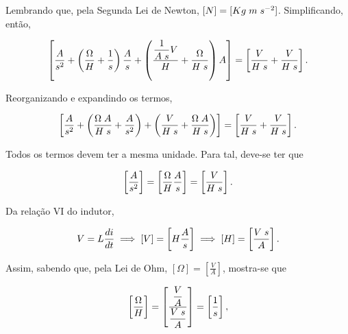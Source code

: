 \documentclass{article}
\numberwithin{equation}{section}
\let\l\left
\let\r\right
\let\dfr\dfrac
\begin{document}
\noindent Lembrando que, pela Segunda Lei de Newton, $[N] = [Kg \hspace{1mm} m \hspace{1mm}s^{-2}]$. Simplificando, então,

\begin{equation*}
    \l[ \dfr{A}{s^2} + \l( \dfr{\Omega}{H} + \dfr{1}{s}\r)\dfr{A}{s} + \l( \dfr{\dfr{1}{A \hspace{1mm} s} V}{H} + \dfr{\Omega}{H \hspace{1mm} s} \r) A \r] = \l[ \dfr{V}{H \hspace{1mm} s}  + \dfr{V}{H \hspace{1mm} s}\r].
\end{equation*}

\noindent Reorganizando e expandindo os termos,

\begin{equation*}
    \l[ \dfr{A}{s^2} + \l( \dfr{\Omega \hspace{1mm} A}{H \hspace{1mm} s} + \dfr{A}{s^2}\r) + \l( \dfr{V}{H \hspace{1mm} s} + \dfr{\Omega \hspace{1mm} A}{H \hspace{1mm} s} \r) \r] = \l[ \dfr{V}{H \hspace{1mm} s}  + \dfr{V}{H \hspace{1mm} s}\r].
\end{equation*}

\noindent Todos os termos devem ter a mesma unidade. Para tal, deve-se ter que

\begin{equation*}
    \l[\dfr{A}{s^2} \r] = \l[ \dfr{\Omega}{H} \dfr{A}{s} \r] = \l[ \dfr{V}{H \hspace{1mm} s} \r].
\end{equation*}

\noindent Da relação VI do indutor,

\begin{equation*}
    V = L \dfr{di}{dt} \implies [V] = \l[ H \dfr{A}{s} \r] \implies [H] = \l[ \dfr{V \hspace{1mm} s}{A} \r].
\end{equation*}

\noindent Assim, sabendo que, pela Lei de Ohm, $[\Omega] = \l[\frac{V}{A}\r]$, mostra-se que

\begin{equation*}
    \l[ \dfr{\Omega}{H} \r] = \l[\dfr{\dfr{V}{A}}{\dfr{V \hspace{1mm} s}{A}}\r] = \l[\dfr{1}{s}\r],
\end{equation*}
\end{document}
